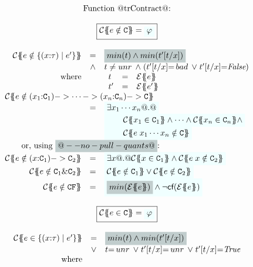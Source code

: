 \begin{figure}
\[\begin{array}{c}
\mbox{Function @trContract@:} \\ \\
\ruleform{\trc{e \notin \Ct} = \formula{\phi}} \\ \\
\begin{array}{rcl}
\trc{e \notin \{(x{:}\tau) \mid e' \}}
  & = & \highlight{min(t) \land min(t'[t/x])} \\
  & \land & t \neq \unr
    \; \land \; (t'[t/x] {=} \bad \; \lor \; t'[t/x] {=} \False ) \\
 \mbox{where} &  &
    \begin{array}[t]{lcl}
      t  & = & \etrans{\Sigma}{\Gamma}{e} \\
      t' & = & \etrans{\Sigma}{\Gamma}{e'}
    \end{array}
\\
\multicolumn{3}{l}{\trc{e \notin (x_1{:}\Ct_1) -> \cdots -> (x_n{:}\Ct_n) -> \Ct}} \\
  & = & \formula{\exists x_1 \cdots x_n @.@} \\
  &   & \formula{\qquad\trc{x_1 \in \Ct_1} \land \cdots \land \trc{x_n \in \Ct_n} \land} \\
  &   & \formula{\qquad\trc{e\;x_1 \cdots x_n \notin \Ct}}
\\
\multicolumn{3}{l}{\qquad\text{or, using \highlight{@--no-pull-quants@}:}} \\
\trc{e \notin (x{:}\Ct_1) -> \Ct_2}
  & = & \formula{\exists x @.@ \trc{x \in \Ct_1}
                          \land \trc{e\;x \notin \Ct_2}}
\\
\trc{e \notin \Ct_1 \& \Ct_2}
   & = & \formula{ \trc{e \notin \Ct_1} \lor
                   \trc{e \notin \Ct_2}}
\\
\trc{e \notin \CF} & = & \formula{\highlight{min(\etrans{}{}{e})} \land
                                               \neg\lcf{\etrans{\Sigma}{\Gamma}{e}}} \\
\end{array} \\ \\
\ruleform{\trc{e \in \Ct} = \formula{\phi}} \\ \\
\begin{array}{rcl}
\trc{e \in \{(x{:}\tau) \mid e' \}}
  & = & \highlight{min(t) \land min(t'[t/x])} \\
  & \lor & t {=} \unr
    \; \lor \; t'[t/x] {=} \unr
    \; \lor \; t'[t/x] {=} \True \\
 \mbox{where}  &  &
    \begin{array}[t]{lcl}

\end{array}
\end{array}
\end{array}\]
\end{figure}
